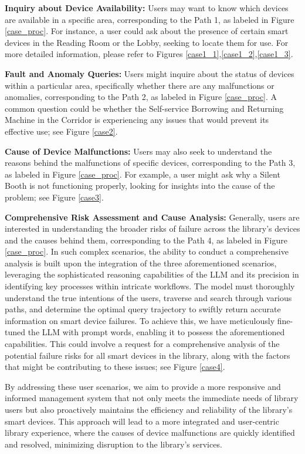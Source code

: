 \documentclass[preprint,12pt]{elsarticle}
\begin{document}
\textbf{Inquiry about Device Availability:} Users may want to know which devices are available in a specific area, corresponding to the Path 1, as labeled in Figure \ref{case_proc}. For instance, a user could ask about the presence of certain smart devices in the Reading Room or the Lobby, seeking to locate them for use. For more detailed information, please refer to Figures \ref{case1_1},\ref{case1_2},\ref{case1_3}.

\textbf{Fault and Anomaly Queries:} Users might inquire about the status of devices within a particular area, specifically whether there are any malfunctions or anomalies, corresponding to the Path 2, as labeled in Figure \ref{case_proc}. A common question could be whether the Self-service Borrowing and Returning Machine in the Corridor is experiencing any issues that would prevent its effective use; see Figure \ref{case2}.

\textbf{Cause of Device Malfunctions:} Users may also seek to understand the reasons behind the malfunctions of specific devices, corresponding to the Path 3, as labeled in Figure \ref{case_proc}. For example, a user might ask why a Silent Booth is not functioning properly, looking for insights into the cause of the problem; see Figure \ref{case3}.

\textbf{Comprehensive Risk Assessment and Cause Analysis:} Generally, users are interested in understanding the broader risks of failure across the library's devices and the causes behind them, corresponding to the Path 4, as labeled in Figure \ref{case_proc}. 
In such complex scenarios, the ability to conduct a comprehensive analysis is built upon the integration of the three aforementioned scenarios, leveraging the sophisticated reasoning capabilities of the LLM and its precision in identifying key processes within intricate workflows. The model must thoroughly understand the true intentions of the users, traverse and search through various paths, and determine the optimal query trajectory to swiftly return accurate information on smart device failures. To achieve this, we have meticulously fine-tuned the LLM with prompt words, enabling it to possess the aforementioned capabilities.
This could involve a request for a comprehensive analysis of the potential failure risks for all smart devices in the library, along with the factors that might be contributing to these issues; see Figure \ref{case4}.

By addressing these user scenarios, we aim to provide a more responsive and informed management system that not only meets the immediate needs of library users but also proactively maintains the efficiency and reliability of the library's smart devices. This approach will lead to a more integrated and user-centric library experience, where the causes of device malfunctions are quickly identified and resolved, minimizing disruption to the library's services.
\end{document}
